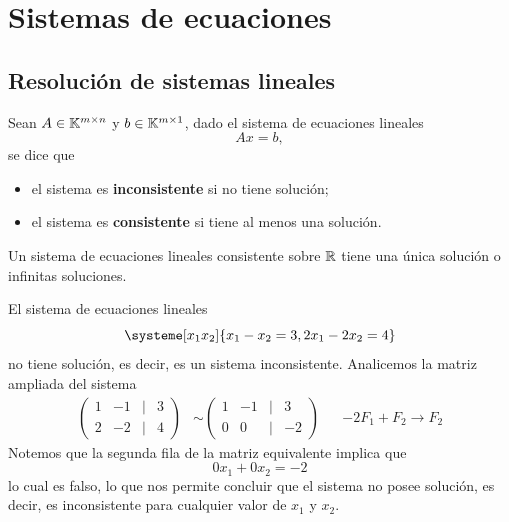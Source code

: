 \documentclass[compacto,10pt]{pubciencias-notas}
\begin{document}
\encabezado

\vspace*{-8mm}

\setcounter{section}{1}
\section{Sistemas de ecuaciones}
\setcounter{subsection}{1}
\subsection{Resolución de sistemas lineales}

\setcounter{defi}{2}
\begin{defi}
    Sean $A\in \Mat[\K]{m}{n}$ y $b\in \Mat[\K]{m}{1}$, dado el sistema de ecuaciones lineales
    \[
        Ax=b,
    \]
    se dice que
    \begin{itemize}
    \item
        el sistema es \textbf{inconsistente} si no tiene solución;
    \item
        el sistema es \textbf{consistente} si tiene al menos una solución.
    \end{itemize}
\end{defi}
\begin{teo}
    Un sistema de ecuaciones lineales consistente sobre $\R$ tiene
    una única solución o infinitas soluciones.
\end{teo}

\begin{ejem}\hspace{0pt} 
El sistema de ecuaciones lineales
\[
    \systeme[x_1 x_2]{x_1 -x_2 = 3,
        2x_1 -2x_2 = 4}
\]
no tiene solución, es decir, es un sistema inconsistente. Analicemos la matriz ampliada del sistema
\begin{align*}
    \begin{pmatrix}
    1&-1&|&3\\
    2&-2&|&4
    \end{pmatrix}
    &\sim
    \begin{pmatrix}
    1&-1&|&3\\
    0&0&|&-2
    \end{pmatrix} 
    && -2F_{1} + F_{2} \to F_{2}
\end{align*}
Notemos que la segunda fila de la matriz equivalente implica que
\[
    0x_{1} + 0x_{2} = -2
\]
lo cual es falso, lo que nos permite concluir que el sistema no posee solución, es decir, es inconsistente para cualquier valor de $x_{1}$ y $x_{2}$.
\end{ejem}
\end{document}
